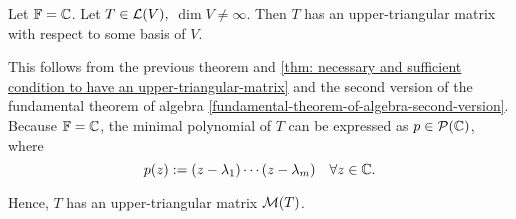 \setcounter{thm}{46}
\begin{thm}
  \label{thm: sufficienct condition about the field for every operator on V to have an upper-triangular matrix}
  Let $\mathbb{F} = \mathbb{C}$. Let $T\in \mathcal{L} (V),$ $\dim V \neq \infty$. Then $T$ has an upper-triangular matrix with respect to some basis of $V$.
\end{thm}
\begin{prf}
  This follows from the previous theorem and \ref{thm: necessary and sufficient condition to have an upper-triangular-matrix} and the second version of the fundamental theorem of algebra \ref{fundamental-theorem-of-algebra-second-version}. Because $\mathbb{F} = \mathbb{C}$, the minimal polynomial of $T$ can be expressed as $p \in \mathcal{P}(\mathbb{C})$, where
  \begin{equation}
    p (z) := (z-\lambda_1) \cdots (z-\lambda_m) \quad \forall z \in \mathbb{C}.
  \end{equation}

  Hence, $T$ has an upper-triangular matrix $\mathcal{M}(T)$.
\end{prf}
